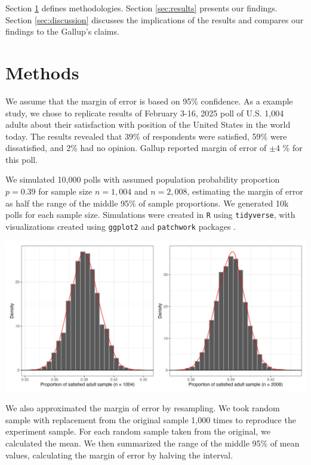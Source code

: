 \documentclass{article}\usepackage[]{graphicx}\usepackage[]{xcolor}
\newenvironment{Figure}
  {\par\medskip\noindent\minipage{\linewidth}}
  {\endminipage\par\medskip}
\begin{document}
\begin{multicols}{2}
Section \ref{sec:methods} defines methodologies. Section \ref{sec:results} presents our findings. Section \ref{sec:discussion} discusses the implications of the results and compares our findings to the Gallup's claims.



\section{Methods}\label{sec:methods}
We assume that the margin of error is based on 95\% confidence. As a example study, we chose to replicate results of February 3-16, 2025 poll of U.S. 1,004 adults about their satisfaction with position of the United States in the world today. The results revealed that 39\% of respondents were satisfied, 59\% were dissatisfied, and 2\% had no opinion. Gallup reported margin of error of  $\pm$4 \% for this poll.

We simulated 10,000 polls with assumed population probability proportion $p=0.39$ for sample size $n=1,004$ and $n=2,008$, estimating the margin of error as half the range of the middle 95\% of sample proportions. We generated 10k polls for each sample size. Simulations were created in \texttt{R} using \texttt{tidyverse}, with visualizations created using \texttt{ggplot2} and \texttt{patchwork} packages \citep{tidyverse, ggplot, patchwork}.

\begin{Figure} 
 \centering
 \includegraphics[width=\linewidth]{simulation.png}
 \label{fig:sim}
\end{Figure}

We also approximated the margin of error by resampling. We took random sample with replacement from the original sample 1,000 times to reproduce the experiment sample. For each random sample taken from the original, we calculated the mean. We then summarized the range of the middle 95\% of mean values, calculating the margin of error by halving the interval.


\end{multicols}
\end{document}
